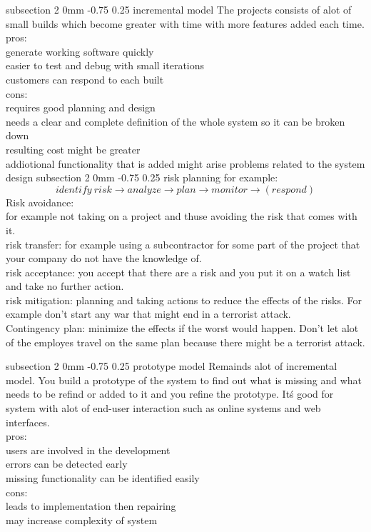 \documentclass[a4paper,11pt]{article}
\makeatletter
\renewcommand{\subsection}{\@startsection
   {subsection}%
   {2}%
   {0mm}%
   {-0.75\baselineskip}%
   {0.25\baselineskip}%
   {\rmfamily\normalfont\slshape\normalsize}}%
\makeatother
\begin{document}
\subsection{incremental model}
The projects consists of alot of small builds which become greater with time with more features added each time. \\
pros:\\
generate working software quickly
\\easier to test and debug with small iterations
\\customers can respond to each built
\\cons:
\\requires good planning and design
\\needs a clear and complete definition of the whole system so it can be broken down
\\resulting cost might be greater
\\addiotional functionality that is added might arise problems related to the system design 
\subsection{risk planning}
for example:
$$identify\: risk\rightarrow analyze\rightarrow plan\rightarrow monitor \rightarrow (respond)$$
Risk avoidance:
\\ for example not taking on a project and thuse avoiding the risk that comes with it.
\\risk transfer:
for example using a subcontractor for some part of the project that your company do not have the knowledge of.
\\risk acceptance:
you accept that there are a risk and you put it on a watch list and take no further action.
\\risk mitigation:
planning and taking actions to reduce the effects of the risks. For example don't start any war that might end in a terrorist attack.
\\Contingency plan: minimize the effects if the worst would happen. Don't let alot of the employes travel on the same plan because there might be a terrorist attack.

\subsection{prototype model}
Remainds alot of incremental model. You build a prototype of the system to find out what is missing and what needs to be refind or added to it and you refine the prototype. Itś good for system with alot of end-user interaction such as online systems and web interfaces. 
\\pros:
\\users are involved in the development
\\errors can be detected early
\\missing functionality can be identified easily
\\cons:
\\leads to implementation then repairing
\\may increase complexity of system
\end{document}
